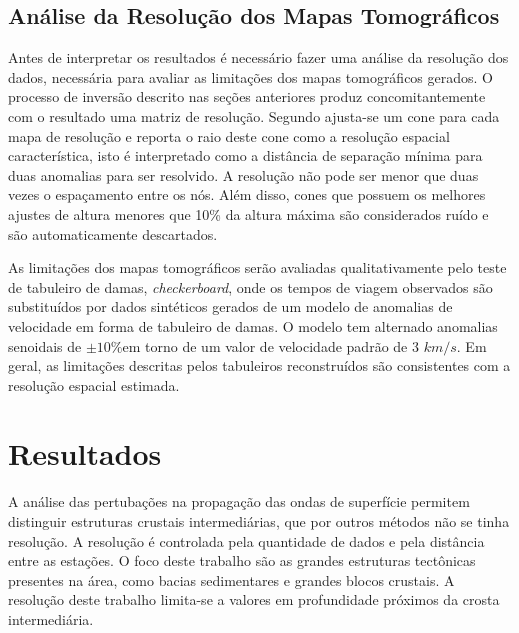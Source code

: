 \subsection{Análise da Resolução dos Mapas Tomográficos}

Antes de interpretar os resultados é necessário fazer uma análise da resolução dos dados, necessária para avaliar as limitações dos mapas tomográficos gerados. O processo de inversão descrito nas seções anteriores produz concomitantemente com o resultado uma matriz de resolução. Segundo \cite{barmin_fast_2001} ajusta-se um cone para cada mapa de resolução e reporta o raio deste cone como a resolução espacial característica, isto é interpretado como a distância de separação mínima para duas anomalias para ser resolvido. A resolução não pode ser menor que duas vezes o espaçamento entre os nós. Além disso, cones que possuem os melhores ajustes de altura menores que 10\% da altura máxima são considerados ruído e são automaticamente descartados.  

As limitações dos mapas tomográficos serão avaliadas qualitativamente pelo teste de tabuleiro de damas, \textit{checkerboard}, onde os tempos de viagem observados são substituídos por dados sintéticos gerados de um modelo de anomalias  de velocidade em forma de tabuleiro de damas. O modelo tem alternado anomalias senoidais de $\pm 10\% $em torno de um valor de velocidade padrão de 3 $km/s$. Em geral, as limitações descritas pelos tabuleiros reconstruídos são consistentes com a resolução espacial estimada.

\section{Resultados}

A análise das pertubações na propagação das ondas de superfície permitem distinguir estruturas crustais intermediárias, que por outros métodos não se tinha resolução. A resolução é controlada pela quantidade de dados e pela distância entre as estações. O foco deste trabalho são as grandes estruturas tectônicas presentes na área, como bacias sedimentares e grandes blocos crustais. A resolução deste trabalho limita-se a valores em profundidade próximos da crosta intermediária.

